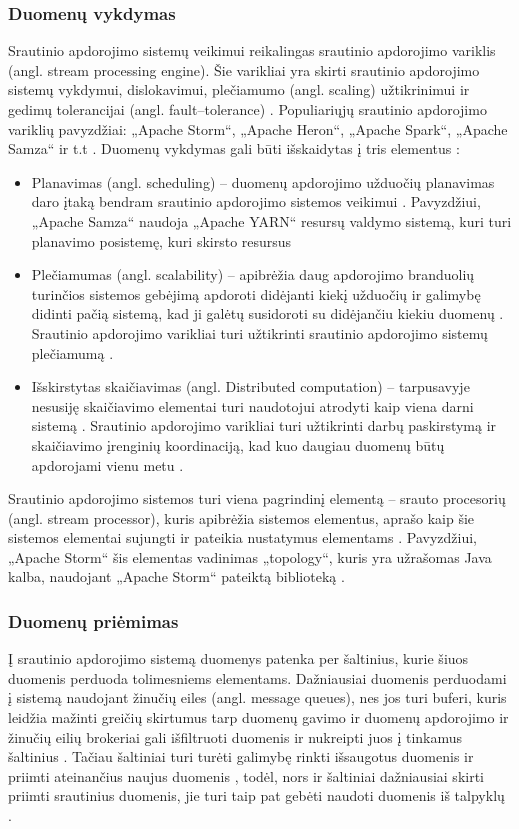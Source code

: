 \documentclass{VUMIFPSbakalaurinis}
\begin{document}
\subsubsection{Duomenų vykdymas}
Srautinio apdorojimo sistemų veikimui reikalingas srautinio apdorojimo variklis (angl. stream processing engine). Šie varikliai yra skirti srautinio apdorojimo sistemų vykdymui, dislokavimui, plečiamumo (angl. scaling) užtikrinimui ir gedimų tolerancijai (angl. fault–tolerance) \cite{zhao2017taxonomy}. Populiariųjų srautinio apdorojimo variklių pavyzdžiai: „Apache Storm“, „Apache Heron“, „Apache Spark“, „Apache Samza“ ir t.t \cite{roger2019comprehensive}. 
Duomenų vykdymas gali būti išskaidytas į tris elementus \cite{zhao2017taxonomy}: 
\begin{itemize}
    \item Planavimas (angl. scheduling) – duomenų apdorojimo užduočių planavimas daro įtaką bendram srautinio apdorojimo sistemos veikimui \cite{falt2011task}. Pavyzdžiui, „Apache Samza“ naudoja „Apache YARN“ resursų valdymo sistemą, kuri turi planavimo posistemę, kuri skirsto resursus \cite{noghabi2017samza} 
    \item Plečiamumas (angl. scalability) – apibrėžia daug apdorojimo branduolių turinčios sistemos gebėjimą apdoroti didėjanti kiekį užduočių ir galimybę didinti pačią sistemą, kad ji galėtų susidoroti su didėjančiu kiekiu duomenų \cite{bondi2000characteristics}. Srautinio apdorojimo varikliai turi užtikrinti srautinio apdorojimo sistemų plečiamumą \cite{stonebraker20058}.    
    \item Išskirstytas skaičiavimas (angl. Distributed computation) – tarpusavyje nesusiję skaičiavimo elementai turi naudotojui atrodyti kaip viena darni sistemą \cite{tanenbaum2007distributed}. Srautinio apdorojimo varikliai turi užtikrinti darbų paskirstymą ir skaičiavimo įrenginių koordinaciją, kad kuo daugiau duomenų būtų apdorojami vienu metu \cite{zhao2017taxonomy}.
\end{itemize}
Srautinio apdorojimo sistemos turi viena pagrindinį elementą – srauto procesorių (angl. stream processor), kuris apibrėžia sistemos elementus, aprašo kaip šie sistemos elementai sujungti ir pateikia nustatymus elementams \cite{zhao2017taxonomy}. Pavyzdžiui, „Apache Storm“ šis elementas vadinimas „topology“, kuris yra užrašomas Java kalba, naudojant „Apache Storm“ pateiktą biblioteką \cite{iqbal2015big}.
\subsubsection{Duomenų priėmimas}
Į srautinio apdorojimo sistemą duomenys patenka per šaltinius, kurie šiuos duomenis perduoda tolimesniems elementams. Dažniausiai duomenis perduodami į sistemą naudojant žinučių eiles (angl. message queues), nes jos turi buferi, kuris leidžia mažinti greičių skirtumus tarp duomenų gavimo ir duomenų apdorojimo ir žinučių eilių brokeriai gali išfiltruoti duomenis ir nukreipti juos į tinkamus šaltinius \cite{kamburugamuve2016survey}. Tačiau šaltiniai turi turėti galimybę rinkti išsaugotus duomenis ir priimti ateinančius naujus duomenis \cite{stonebraker20058}, todėl, nors ir šaltiniai dažniausiai skirti priimti srautinius duomenis, jie turi taip pat gebėti naudoti duomenis iš talpyklų \cite{zhao2017taxonomy}. 
\end{document}
